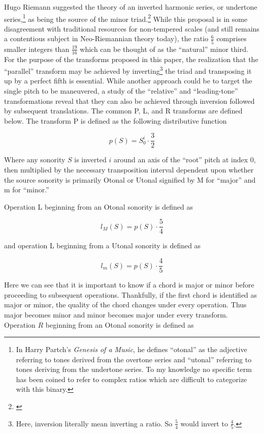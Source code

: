 Hugo Riemann suggested the theory of an inverted harmonic series, or undertone series,\footnote{In Harry Partch's \textit{Genesis of a Music}, he defines ``otonal'' as the adjective referring to tones derived from the overtone series and ``utonal'' referring to tones deriving from the undertone series. To my knowledge no specific term has been coined to refer to complex ratios which are difficult to categorize with this binary.} as being the source of the minor triad.\footnote{\citet[3]{riemann}} While this proposal is in some disagreement with traditional resources for non-tempered scales (and still remains a contentious subject in Neo-Riemannian theory today), the ratio $\frac{6}{5}$ comprises smaller integers than $\frac{19}{16}$ which can be thought of as the ``natural'' minor third. For the purpose of the transforms proposed in this paper, the realization that the ``parallel'' transform may be achieved by inverting\footnote{Here, inversion literally mean inverting a ratio. So $\frac{5}{4}$ would invert to $\frac{4}{5}$.} the triad and transposing it up by a perfect fifth is essential. While another approach could be to target the single pitch to be maneuvered, a study of the ``relative'' and ``leading-tone'' transformations reveal that they can also be achieved through inversion followed by subsequent translations. The common P, L, and R transforms are defined below. The transform P is defined as the following distributive function

\begin{equation}
    p(S)=S_{0}^{i}\cdot\frac{3}{2}
\end{equation}

Where any sonority $S$ is inverted $i$ around an axis of the “root” pitch at index $0$, then multiplied by the necessary transposition interval dependent upon whether the source sonority is primarily Otonal or Utonal signified by M for “major” and m for “minor.”

Operation L beginning from an Otonal sonority is defined as

\begin{equation}
    l_{M}(S)=p(S)\cdot\frac{5}{4}
\end{equation}

and operation L beginning from a Utonal sonority is defined as

\begin{equation}
    l_{m}(S)=p(S)\cdot\frac{4}{5}
\end{equation}

Here we can see that it is important to know if a chord is major or minor before proceeding to subsequent operations. Thankfully, if the first chord is identified as major or minor, the quality of the chord changes under every operation. Thus major becomes minor and minor becomes major under every transform. Operation $R$ beginning from an Otonal sonority is defined as

